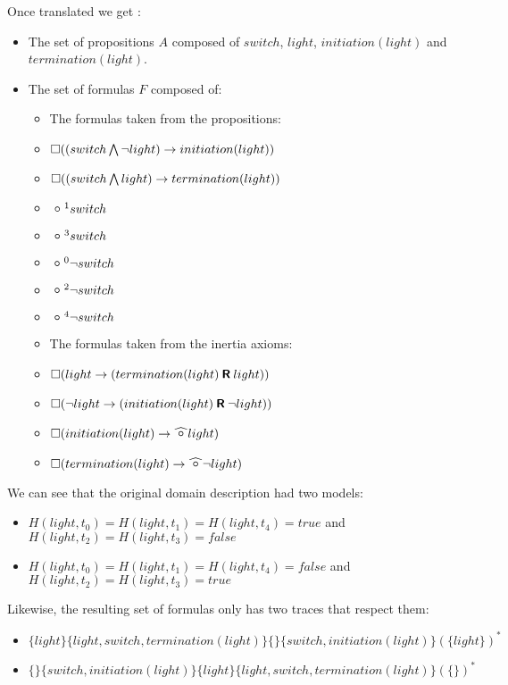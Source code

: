 Once translated we get :
\begin{itemize}
  \item The set of propositions $A$ composed of $switch$, $light$, $initiation(light)$ and $termination(light)$.
  \item The set of formulas $F$ composed of:
  \begin{itemize}
    \item The formulas taken from the propositions:
    \item $\square((switch\bigwedge \neg light)\rightarrow initiation(light))$
    \item $\square((switch\bigwedge light)\rightarrow termination(light))$
    \item $\next^{1}switch$
    \item $\next^{3}switch$
    \item $\next^{0}\neg switch$
    \item $\next^{2}\neg switch$
    \item $\next^{4}\neg switch$
    \item The formulas taken from the inertia axioms:
    \item $\square(light\rightarrow (termination(light) \mathbin{\bm{\mathsf{R}}} light))$
    \item $\square(\neg light\rightarrow (initiation(light) \mathbin{\bm{\mathsf{R}}} \neg light))$
    \item $\alwaysF(initiation(light)\rightarrow\wnext light)$
    \item $\alwaysF(termination(light)\rightarrow\wnext \neg light)$
  \end{itemize}
\end{itemize}

We can see that the original domain description had two models:
\begin{itemize}
  \item $H(light,t_0)=H(light,t_1)=H(light,t_4)=true$ and $H(light,t_2)=H(light,t_3)=false$
  \item $H(light,t_0)=H(light,t_1)=H(light,t_4)=false$ and $H(light,t_2)=H(light,t_3)=true$
\end{itemize}

Likewise, the resulting set of formulas only has two traces that respect them:
\begin{itemize}
  \item $\{light\}\{light,switch,termination(light)\}\{\}\{switch,initiation(light)\}(\{light\})^*$
  \item $\{\}\{switch,initiation(light)\}\{light\}\{light,switch,termination(light)\}(\{\})^*$
\end{itemize}
